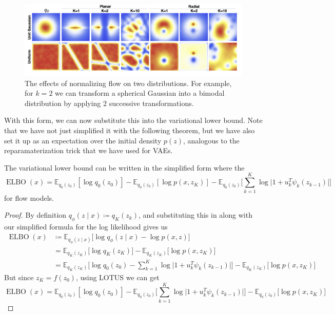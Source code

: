 \documentclass{article}
\DeclareMathOperator{\elbo}{ELBO}
\begin{document}
  \begin{figure}[H]
    \centering 
    \includegraphics[scale=0.4]{img/contractions.png}
    \caption{The effects of normalizing flow on two distributions. For example, for $k=2$ we can transform a spherical Gaussian into a bimodal distribution by applying 2 successive transformations. } 
    \label{fig:contractions}
  \end{figure} 

  With this form, we can now substitute this into the variational lower bound. Note that we have not just simplified it with the following theorem, but we have also set it up as an expectation over the initial density $p(z)$, analogous to the reparamaterization trick that we have used for VAEs. 

  \begin{theorem}
    The variational lower bound can be written in the simplified form where the 
    \begin{equation}
      \elbo(x) = \mathbb{E}_{q_0 (z_0)} [ \log q_0 (z_0)] - \mathbb{E}_{q_0 (z_0)} [ \log p(x, z_K)] - \mathbb{E}_{q_0 (z_0)} \bigg[ \sum_{k=1}^K \log \big| 1 + u_k^T \psi_k (z_{k-1}) \big| \bigg]
    \end{equation}
    for flow models. 
  \end{theorem}
  \begin{proof}
    By definition $q_\phi(z \mid x) \coloneqq q_K (z_k)$, and substituting this in along with our simplified formula for the log likelihood gives us 
    \begin{align}
      \elbo(x) & \coloneqq \mathbb{E}_{q_\phi (z \mid x)} \big[ \log q_\phi (z \mid x) - \log p(x, z) \big] \\
               & = \mathbb{E}_{q_K (z_K)} \big[ \log q_K (z_K) \big] - \mathbb{E}_{q_K (z_K)} \big[ \log p(x, z_K) \big]  \\ 
               & = \mathbb{E}_{q_K (z_K)}  \bigg[ \log q_0 (z_0) - \sum_{k=1}^K \log \big| 1 + u_k^T \psi_k (z_{k-1}) \big| \bigg] - \mathbb{E}_{q_K (z_K)} \big[ \log p(x, z_K) \big] 
    \end{align}
    But since $z_K = f(z_0)$, using LOTUS we can get 
    \begin{equation}
      \elbo(x) = \mathbb{E}_{q_0 (z_0)} [\log q_0 (z_0)] - \mathbb{E}_{q_0 (z_0)}  \bigg[ \sum_{k=1}^K \log \big| 1 + u_k^T \psi_k (z_{k-1}) \big| \bigg] - \mathbb{E}_{q_0 (z_0)} \big[ \log p(x, z_K) \big] 
    \end{equation}
  \end{proof} 
\end{document}
